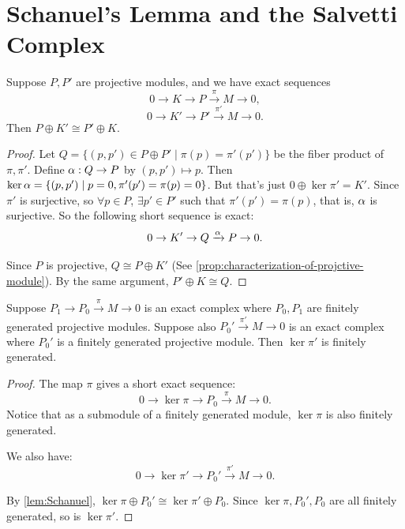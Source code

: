 \section{Schanuel's Lemma and the Salvetti Complex}
\label{sec:L07-W03D2}

\begin{lemma}
    \label{lem:Schanuel}
    Suppose \(P, P'\) are projective modules, and we have exact sequences
    \[ 0 \to K \to P \xrightarrow{\pi} M \to 0 ,\] 
    \[ 0 \to K' \to P' \xrightarrow{\pi'} M \to 0 .\]
    Then  \(P\oplus K' \cong P' \oplus K\).
\end{lemma}
\begin{proof}
    Let \(Q = \{(p,p')\in P\oplus P' \mid \pi(p) = \pi'(p')\}\) be the fiber product of \(\pi, \pi'\). Define \(\alpha: Q \to P\) by \((p,p')\mapsto p\). Then \(\ker \alpha = \{(p,p') \mid p=0, \pi'(p') = \pi(p)=0\}\). But that's just \(0\oplus \ker \pi' =  K'\). Since \(\pi'\) is surjective, so \(\forall p \in P\), \(\exists p'\in P'\) such that \(\pi'(p') = \pi(p)\), that is, \(\alpha\) is surjective. So the following short sequence is exact:
    \[ 0 \to K' \to Q \xrightarrow{\alpha} P \to 0.\]

    Since \(P\) is projective, \(Q\cong P\oplus K'\) (See \cref{prop:characterization-of-projctive-module}). By the same argument, \(P'\oplus K \cong Q\).
\end{proof}

\begin{corollary}
    \label{cor:kernel-of-fg-projective-complex}
    Suppose \(P_1 \to P_0 \xrightarrow{\pi} M \to 0\) is an exact complex where \(P_0, P_1\) are finitely generated projective modules. Suppose also \(P_0'\xrightarrow{\pi'} M \to 0\) is an exact complex where \(P_0'\) is a finitely generated projective module. Then \(\ker \pi'\) is finitely generated.
\end{corollary}
\begin{proof}
    The map \(\pi\) gives a short exact sequence:
    \[0 \to \ker \pi \to P_0 \xrightarrow{\pi} M \to 0.\]
    Notice that as a submodule of a finitely generated module, \(\ker \pi\) is also finitely generated.

    We also have:
    \[0 \to \ker \pi' \to P_0' \xrightarrow{\pi'} M \to 0.\]

    By \cref{lem:Schanuel}, \(\ker \pi \oplus P_0' \cong \ker \pi' \oplus P_0\). Since \(\ker \pi, P_0', P_0\) are all finitely generated, so is \(\ker \pi'\).
\end{proof}

